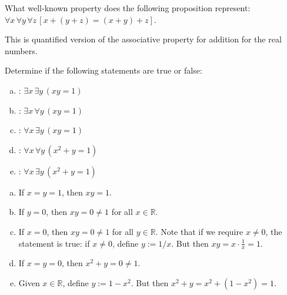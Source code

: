 \documentclass[11pt,letterpaper]{article}
\begin{document}
\newpage





 What well-known property does the following proposition represent: $\forall x\, \forall y\, \forall z\, [x + (y + z) = (x + y) + z]$.

\sol This is quantified version of the associative property for addition for the real numbers. 





\newpage





 Determine if the following statements are true or false:
	\begin{enumerate}[(a)]
	\item {}: $\exists x\, \exists y\, (xy = 1)$
	\item {}: $\exists x\, \forall y\, (xy= 1)$
	\item {}: $\forall x\, \exists y\, (xy= 1)$
	\item {}: $\forall x\, \forall y\, (x^2 + y = 1)$
	\item {}: $\forall x\, \exists y\, (x^2 + y= 1)$
	\end{enumerate}

\sol

\begin{enumerate}[(a)]
\item If $x= y= 1$, then $xy= 1$. 

\item If $y= 0$, then $xy= 0 \neq 1$ for all $x \in \mathbb{R}$. 

\item If $x= 0$, then $xy= 0 \neq 1$ for all $y \in \mathbb{R}$. Note that if we require $x \neq 0$, the statement is true: if $x \neq 0$, define $y:= 1/x$. But then $xy= x \cdot \frac{1}{x}= 1$. 

\item If $x= y= 0$, then $x^2 + y= 0 \neq 1$. 

\item Given $x \in \mathbb{R}$, define $y:= 1 - x^2$. But then $x^2 + y= x^2 + (1 - x^2)= 1$. 
\end{enumerate}





\newpage
\end{document}
